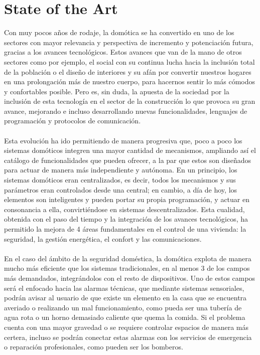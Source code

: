 \chapter{State of the Art}

Con muy pocos años de rodaje, la domótica se ha convertido en uno de los sectores con mayor relevancia y perspectiva de incremento y potenciación futura, gracias a los avances tecnológicos. Estos avances que van de la mano de otros sectores como por ejemplo, el social con su continua lucha hacia la inclusión total de la población o el diseño de interiores y su afán por convertir nuestros hogares en una prolongación más de nuestro cuerpo, para hacernos sentir lo más cómodos y confortables posible. Pero es, sin duda, la apuesta de la sociedad por la inclusión de esta tecnología en el sector de la construcción lo que provoca su gran avance, mejorando e incluso desarrollando nuevas funcionalidades, lenguajes de programación y protocolos de comunicación.\\\\
Esta evolución ha ido permitiendo de manera progresiva que, poco a poco los sistemas domóticos integren una mayor cantidad de mecanismos, ampliando así el catálogo de funcionalidades que pueden ofrecer, a la par que estos son diseñados para actuar de manera más independiente y autónoma. En un principio, los sistemas domóticos eran centralizados, es decir, todos los mecanismos y sus parámetros eran controlados desde una central; en cambio, a día de hoy, los elementos son inteligentes y pueden portar su propia programación, y actuar en consonancia a ella, convirtiéndose en sistemas descentralizados. Esta cualidad, obtenida con el paso del tiempo y la integración de los avances tecnológicos, ha permitido la mejora de 4 áreas fundamentales en el control de una vivienda: la seguridad, la gestión energética, el confort y las comunicaciones.\\\\
En el caso del ámbito de la seguridad doméstica, la domótica explota de manera mucho más eficiente que los sistemas tradicionales, en al menos 3 de los campos más demandados, integrándolos con el resto de dispositivos. Uno de estos campos será el enfocado hacia las alarmas técnicas, que mediante sistemas sensoriales, podrán avisar al usuario de que existe un elemento en la casa que se encuentra averiado o realizando un mal funcionamiento, como pueda ser una tubería de agua rota o un horno demasiado caliente que quema la comida. Si el problema cuenta con una mayor gravedad o se requiere controlar espacios de manera más certera, incluso se podrán conectar estas alarmas con los servicios de emergencia o reparación profesionales, como pueden ser los bomberos. \\\\

